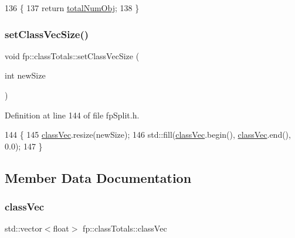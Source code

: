 \begin{DoxyCode}
136                                 \{
137                 \textcolor{keywordflow}{return} \hyperlink{classfp_1_1classTotals_a97be63e3e4a1b7c553df839034828aae}{totalNumObj};
138             \}
\end{DoxyCode}
\mbox{\label{classfp_1_1classTotals_a026ec5ce8d0ad54702891c0d6ba51fc8}} 
\subsubsection{\texorpdfstring{set\+Class\+Vec\+Size()}{setClassVecSize()}}
{\footnotesize\ttfamily void fp\+::class\+Totals\+::set\+Class\+Vec\+Size (\begin{DoxyParamCaption}\item[{int}]{new\+Size }\end{DoxyParamCaption})\hspace{0.3cm}{\ttfamily [inline]}}



Definition at line 144 of file fp\+Split.\+h.


\begin{DoxyCode}
144                                                     \{
145                 \hyperlink{classfp_1_1classTotals_af96102537592dbda8601d0235dfccfca}{classVec}.resize(newSize);
146                 std::fill(\hyperlink{classfp_1_1classTotals_af96102537592dbda8601d0235dfccfca}{classVec}.begin(), \hyperlink{classfp_1_1classTotals_af96102537592dbda8601d0235dfccfca}{classVec}.end(), 0.0);
147             \}
\end{DoxyCode}


\subsection{Member Data Documentation}
\mbox{\label{classfp_1_1classTotals_af96102537592dbda8601d0235dfccfca}} 
\subsubsection{\texorpdfstring{class\+Vec}{classVec}}
{\footnotesize\ttfamily std\+::vector$<$float$>$ fp\+::class\+Totals\+::class\+Vec\hspace{0.3cm}{\ttfamily [protected]}}



